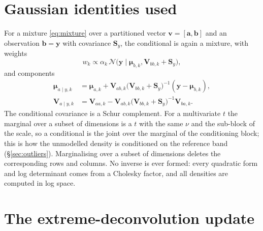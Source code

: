 \documentclass[11pt,a4paper]{article}
\begin{document}
\section{Gaussian identities used}
\label{app:gauss}

For a mixture \eqref{eq:mixture} over a partitioned vector
$\mathbf{v}=[\mathbf{a},\mathbf{b}]$ and an observation $\mathbf{b}=\mathbf{y}$
with covariance $\mathbf{S}_y$, the conditional is again a mixture, with weights
%
\begin{equation}
w_k \propto \alpha_k\,
\mathcal{N}\bigl(\mathbf{y}\mid\boldsymbol{\mu}_{b,k},
\mathbf{V}_{bb,k}+\mathbf{S}_y\bigr),
\end{equation}
%
and components
%
\begin{align}
\boldsymbol{\mu}_{a\mid y,k} &= \boldsymbol{\mu}_{a,k}
  + \mathbf{V}_{ab,k}\bigl(\mathbf{V}_{bb,k}+\mathbf{S}_y\bigr)^{-1}
    (\mathbf{y}-\boldsymbol{\mu}_{b,k}),\\
\mathbf{V}_{a\mid y,k} &= \mathbf{V}_{aa,k}
  - \mathbf{V}_{ab,k}\bigl(\mathbf{V}_{bb,k}+\mathbf{S}_y\bigr)^{-1}
    \mathbf{V}_{ba,k}.
\end{align}
%
The conditional covariance is a Schur complement. For a multivariate $t$ the
marginal over a subset of dimensions is a $t$ with the same $\nu$ and the
sub-block of the scale, so a conditional is the joint over the marginal of the
conditioning block; this is how the unmodelled density is conditioned on the
reference band (\S\ref{sec:outliers}). Marginalising
over a subset of dimensions deletes the corresponding rows and columns. No
inverse is ever formed: every quadratic form and log determinant comes from a
Cholesky factor, and all densities are computed in log space.

\section{The extreme-deconvolution update}
\label{app:xd}
\end{document}
